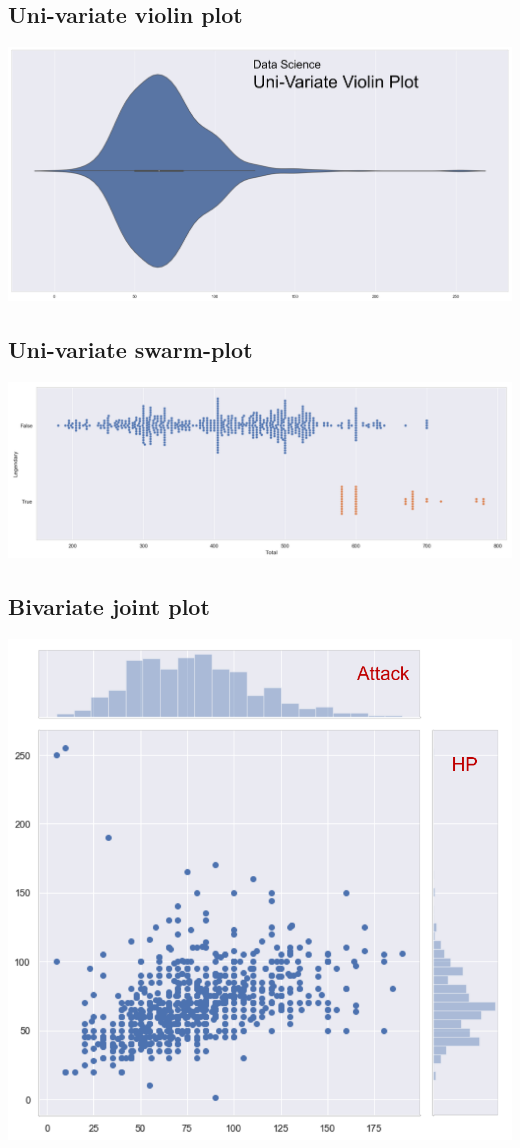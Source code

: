 \documentclass[11pt]{article}
\begin{document}
\subsection{Uni-variate violin plot}
\label{sec:org18eee74}
\begin{center}
\includegraphics[width=.9\linewidth]{./images/uni-variate-violin-plot.png}
\end{center}
\subsection{Uni-variate swarm-plot}
\label{sec:orgf126e4a}
\begin{center}
\includegraphics[width=.9\linewidth]{./images/uni-variate-swarm-plot.png}
\end{center}
\subsection{Bivariate joint plot}
\label{sec:org16ee4ca}
\begin{center}
\includegraphics[width=.9\linewidth]{./images/bi-variate-joint-plot.png}
\end{center}
\end{document}
